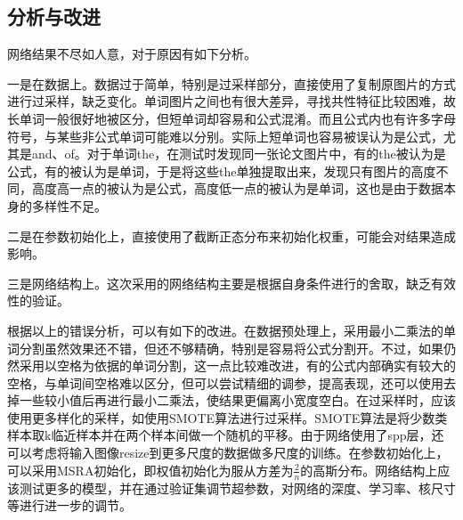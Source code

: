 \subsection{分析与改进}
\noindent

网络结果不尽如人意，对于原因有如下分析。

一是在数据上。数据过于简单，特别是过采样部分，直接使用了复制原图片的方式进行过采样，缺乏变化。单词图片之间也有很大差异，寻找共性特征比较困难，故长单词一般很好地被区分，但短单词却容易和公式混淆。而且公式内也有许多字母符号，与某些非公式单词可能难以分别。实际上短单词也容易被误认为是公式，尤其是and、of。对于单词the，在测试时发现同一张论文图片中，有的the被认为是公式，有的被认为是单词，于是将这些the单独提取出来，发现只有图片的高度不同，高度高一点的被认为是公式，高度低一点的被认为是单词，这也是由于数据本身的多样性不足。

二是在参数初始化上，直接使用了截断正态分布来初始化权重，可能会对结果造成影响。

三是网络结构上。这次采用的网络结构主要是根据自身条件进行的舍取，缺乏有效性的验证。

根据以上的错误分析，可以有如下的改进。在数据预处理上，采用最小二乘法的单词分割虽然效果还不错，但还不够精确，特别是容易将公式分割开。不过，如果仍然采用以空格为依据的单词分割，这一点比较难改进，有的公式内部确实有较大的空格，与单词间空格难以区分，但可以尝试精细的调参，提高表现，还可以使用去掉一些较小值后再进行最小二乘法，使结果更偏离小宽度空白。在过采样时，应该使用更多样化的采样，如使用SMOTE算法进行过采样。SMOTE算法是将少数类样本取k临近样本并在两个样本间做一个随机的平移。由于网络使用了spp层，还可以考虑将输入图像resize到更多尺度的数据做多尺度的训练。在参数初始化上，可以采用MSRA初始化，即权值初始化为服从方差为$\frac 2 n$的高斯分布。\cite{msra}网络结构上应该测试更多的模型，并在通过验证集调节超参数，对网络的深度、学习率、核尺寸等进行进一步的调节。